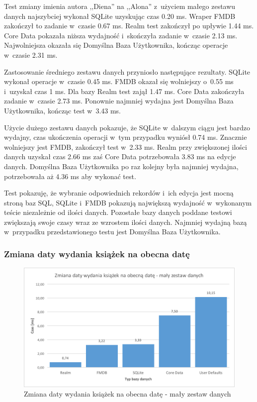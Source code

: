 Test zmiany imienia autora ,,Diena'' na ,,Alona'' z~użyciem małego zestawu danych najszybciej wykonał SQLite uzyskując czas 0.20 ms. Wraper FMDB zakończył to zadanie w~czasie 0.67 ms. Realm test zakończył po upływie 1.44 ms. Core Data pokazała niższa wydajność i~skończyła zadanie w~czasie 2.13 ms. Najwolniejsza okazała się Domyślna Baza Użytkownika, kończąc operacje w~czasie 2.31 ms. 

Zastosowanie średniego zestawu danych przyniosło następujące rezultaty. SQLite wykonał operacje w~czasie 0.45 ms. FMDB okazał się wolniejszy o~0.55 ms i~uzyskał czas 1 ms. Dla bazy Realm test zajął 1.47 ms. Core Data zakończyła zadanie w~czasie 2.73 ms. Ponownie najmniej wydajna jest Domyślna Baza Użytkownika, kończąc test w~3.43 ms.

Użycie dużego zestawu danych pokazuje, że SQLite w~dalszym ciągu jest bardzo wydajny, czas ukończenia operacji w~tym przypadku wyniósł 0.74 ms. Znacznie wolniejszy jest FMDB, zakończył test w~2.33 ms. Realm przy zwiększonej ilości danych uzyskał czas 2.66 ms zaś Core Data potrzebowała 3.83 ms na edycje danych. Domyślna Baza Użytkownika po raz kolejny była najmniej wydajna, potrzebowała aż 4.36 ms aby wykonać test. 

Test pokazuję, że wybranie odpowiednich rekordów i~ich edycja jest mocną stroną baz SQL, SQLite i~FMDB pokazują największą wydajność w~wykonanym teście niezależnie od ilości danych. Pozostałe bazy danych poddane testowi zwiększają swoje czasy wraz ze wzrostem ilości danych. Najmniej wydajną bazą w~przypadku przedstawionego testu jest Domyślna Baza Użytkownika. 

\subsubsection{Zmiana daty wydania książek na obecna datę}

\begin{figure}[H]
    \centering\includegraphics[width=\linewidth]{img/update_data/update_book/update_book_small_test.png}
    \caption{Zmiana daty wydania książek na obecna datę - mały zestaw danych}
    \label{img: update-by-book-small}
\end{figure}

